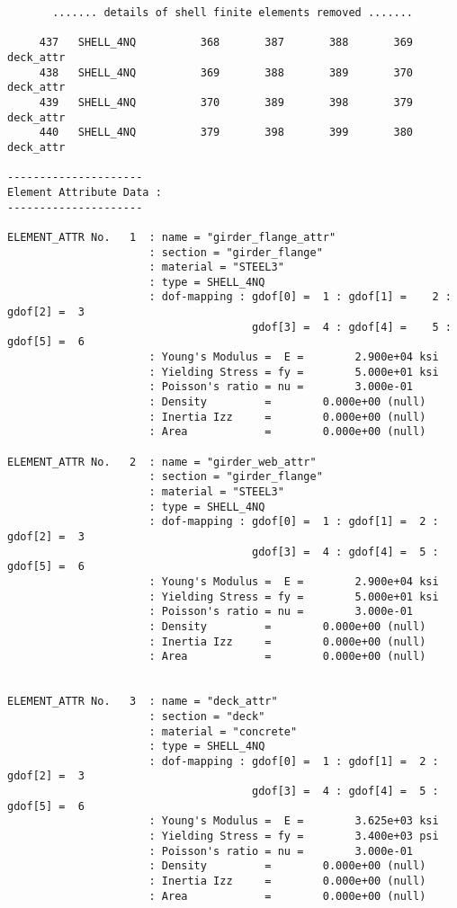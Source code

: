 \begin{footnotesize}
\begin{verbatim}
       ....... details of shell finite elements removed .......

     437   SHELL_4NQ          368       387       388       369      deck_attr
     438   SHELL_4NQ          369       388       389       370      deck_attr
     439   SHELL_4NQ          370       389       398       379      deck_attr
     440   SHELL_4NQ          379       398       399       380      deck_attr

--------------------- 
Element Attribute Data :        
--------------------- 

ELEMENT_ATTR No.   1  : name = "girder_flange_attr" 
                      : section = "girder_flange" 
                      : material = "STEEL3" 
                      : type = SHELL_4NQ
                      : dof-mapping : gdof[0] =  1 : gdof[1] =    2 : gdof[2] =  3
                                      gdof[3] =  4 : gdof[4] =    5 : gdof[5] =  6
                      : Young's Modulus =  E =        2.900e+04 ksi
                      : Yielding Stress = fy =        5.000e+01 ksi
                      : Poisson's ratio = nu =        3.000e-01   
                      : Density         =        0.000e+00 (null)
                      : Inertia Izz     =        0.000e+00 (null)
                      : Area            =        0.000e+00 (null)

ELEMENT_ATTR No.   2  : name = "girder_web_attr" 
                      : section = "girder_flange" 
                      : material = "STEEL3" 
                      : type = SHELL_4NQ
                      : dof-mapping : gdof[0] =  1 : gdof[1] =  2 : gdof[2] =  3
                                      gdof[3] =  4 : gdof[4] =  5 : gdof[5] =  6
                      : Young's Modulus =  E =        2.900e+04 ksi
                      : Yielding Stress = fy =        5.000e+01 ksi
                      : Poisson's ratio = nu =        3.000e-01   
                      : Density         =        0.000e+00 (null)
                      : Inertia Izz     =        0.000e+00 (null)
                      : Area            =        0.000e+00 (null)


ELEMENT_ATTR No.   3  : name = "deck_attr" 
                      : section = "deck" 
                      : material = "concrete" 
                      : type = SHELL_4NQ
                      : dof-mapping : gdof[0] =  1 : gdof[1] =  2 : gdof[2] =  3
                                      gdof[3] =  4 : gdof[4] =  5 : gdof[5] =  6
                      : Young's Modulus =  E =        3.625e+03 ksi
                      : Yielding Stress = fy =        3.400e+03 psi
                      : Poisson's ratio = nu =        3.000e-01   
                      : Density         =        0.000e+00 (null)
                      : Inertia Izz     =        0.000e+00 (null)
                      : Area            =        0.000e+00 (null)
                        

\end{verbatim}
\end{footnotesize}
